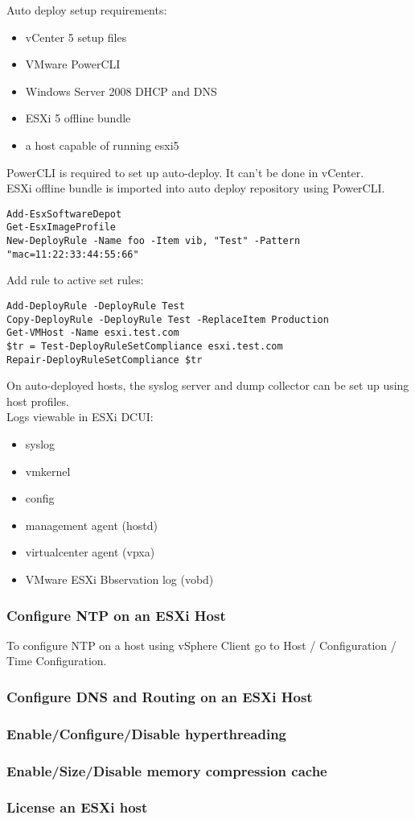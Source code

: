 Auto deploy setup requirements:

\begin{itemize}
\item vCenter 5 setup files
\item VMware PowerCLI
\item Windows Server 2008 DHCP and DNS
\item ESXi 5 offline bundle
\item a host capable of running esxi5
\end{itemize}

PowerCLI is required to set up auto-deploy. It can't be done in vCenter.\\

ESXi offline bundle is imported into auto deploy repository using PowerCLI.

\begin{verbatim}
Add-EsxSoftwareDepot
Get-EsxImageProfile
New-DeployRule -Name foo -Item vib, "Test" -Pattern "mac=11:22:33:44:55:66"  
\end{verbatim}

Add rule to active set rules:

\begin{verbatim}
Add-DeployRule -DeployRule Test
Copy-DeployRule -DeployRule Test -ReplaceItem Production
Get-VMHost -Name esxi.test.com
$tr = Test-DeployRuleSetCompliance esxi.test.com
Repair-DeployRuleSetCompliance $tr
\end{verbatim}

On auto-deployed hosts, the syslog server and dump collector can be set up
using host profiles.\\

Logs viewable in ESXi DCUI:

\begin{itemize}
\item syslog
\item vmkernel
\item config
\item management agent (hostd)
\item virtualcenter agent (vpxa)
\item VMware ESXi Bbservation log (vobd)
\end{itemize}

\subsubsection{Configure NTP on an ESXi Host}

To configure NTP on a host using vSphere Client go to Host / Configuration /
Time Configuration.

\subsubsection{Configure DNS and Routing on an ESXi Host}

\subsubsection{Enable/Configure/Disable hyperthreading}

\subsubsection{Enable/Size/Disable memory compression cache}

\subsubsection{License an ESXi host}
